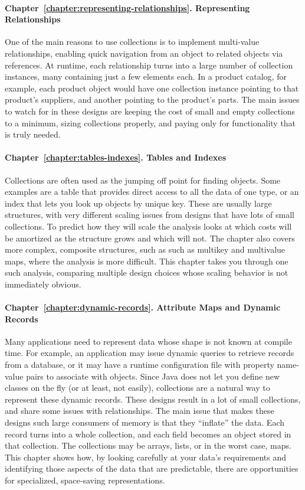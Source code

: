 \paragraph{Chapter~\ref{chapter:representing-relationships}. Representing
Relationships} One of the main reasons to use collections is to implement
multi-value relationships, enabling quick navigation from an object
to related objects via references. At runtime, each relationship turns into a
large number of collection instances, many containing just a few elements each.
In a product catalog, for example, each product object would have one collection
instance pointing to that product's suppliers, and another pointing to the product's
parts. The main issues to watch for in these designs
are keeping the cost of small and empty collections to a minimum, sizing
collections properly, and paying only for functionality that is truly needed.

\paragraph{Chapter~\ref{chapter:tables-indexes}. Tables and Indexes} Collections
are often used as the jumping off point for finding objects. Some
examples are a table that provides direct access to all the data of one
type, or an index that lets you look up objects by unique key.
These are usually large structures, with very different scaling issues
from designs that have lots of small collections. To
predict how they will scale the analysis looks at
which costs will be amortized as the structure grows and which will not. The chapter also covers more complex,
composite structures, such as such as multikey and multivalue maps, where the analysis is more difficult. This chapter takes you through one such analysis,
comparing multiple design choices whose scaling behavior is not immediately obvious.

\paragraph{Chapter~\ref{chapter:dynamic-records}. Attribute Maps and Dynamic
Records} Many applications need to represent data whose shape is not
known at compile time. For example, an application may issue dynamic
queries to retrieve records from a database, or it may have
a runtime configuration file with property name-value pairs to 
associate with objects. Since Java does not let you define new classes on the
fly (or at least, not easily), collections are a natural way to
represent these dynamic records. These designs result in a lot of small collections, and share some
issues with relationships. The main issue that makes these designs such large
consumers of memory is that they ``inflate'' the data. Each record turns
into a whole collection, and each field becomes an object stored in that
collection. The collections may be arrays, lists, or in the worst case, maps. This chapter shows how, by looking carefully at your data's requirements and identifying those aspects of the data
that are predictable, there are opportunities for specialized,
space-saving representations.

